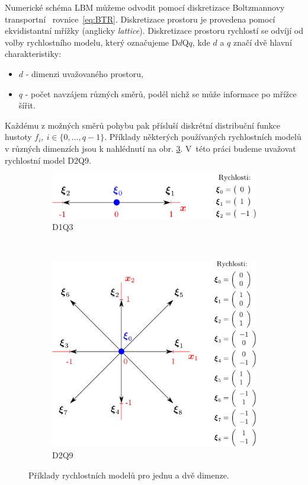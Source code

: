 Numerické schéma LBM můžeme odvodit pomocí diskretizace Boltzmannovy transportní \ rovnice~\eqref{eq:BTR}. Diskretizace prostoru je provedena pomocí ekvidistantní mřížky (anglicky \textit{lattice}).
Diskretizace prostoru rychlostí se odvíjí od volby rychlostního modelu, který označujeme D$d$Q$q$, kde $ d$ a $q $ značí dvě hlavní charakteristiky:
\begin{itemize}
	\item[] $ d $ - dimenzi uvažovaného prostoru,
	\item[] $ q $ - počet navzájem různých směrů, podél nichž se může informace po mřížce šířit.
\end{itemize}
Každému z možných směrů pohybu pak přísluší diskrétní distribuční funkce hustoty \mbox{$ f_{i}, \ i \in \{0,\dots, q-1 \}$}. Příklady některých používaných rychlostních modelů v různých dimenzích jsou k nahlédnutí na obr. \ref{fig:lattice}. V~této práci budeme uvažovat rychlostní model D2Q9.
\begin{figure}[h]
	\centering
	\begin{subfigure}{0.88\textwidth}
		\centering
		\includegraphics[width=.7\textwidth]{Images/d1q3.pdf}
		\caption{D1Q3}
		\label{fig:lattice1}
	\end{subfigure}%
	\\[20pt]
	\begin{subfigure}{0.88\textwidth}
		\centering
		\includegraphics[width=.71\textwidth]{Images/d2q9.pdf}
		\caption{D2Q9}
		\label{fig:lattice2}
	\end{subfigure}
	\vspace{3mm}
	\caption{Příklady rychlostních modelů pro jednu a dvě dimenze.}
\label{fig:lattice}
\end{figure}
